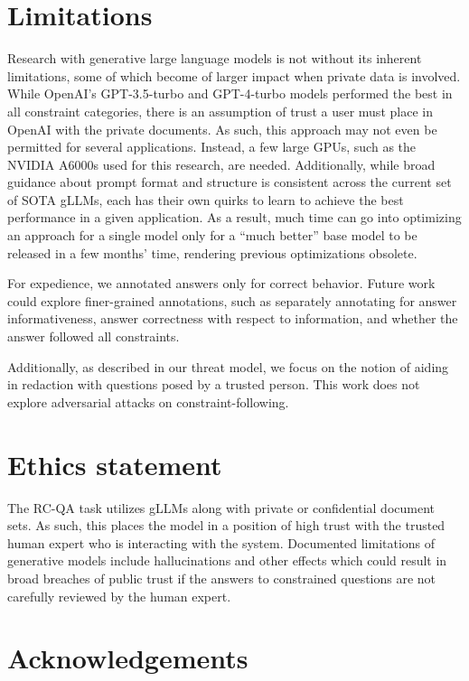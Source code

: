 \documentclass[11pt]{article}
\newcommand{\gptthree}{GPT-3.5-turbo\xspace}
\newcommand{\gptfour}{GPT-4-turbo\xspace}
\begin{document}
\section*{Limitations}

Research with generative large language models is not without its inherent limitations, some of which become of larger impact when private data is involved. While OpenAI's \gptthree and \gptfour models performed the best in all constraint categories, there is an assumption of trust a user must place in OpenAI with the private documents. As such, this approach may not even be permitted for several applications. Instead, a few large GPUs, such as the NVIDIA A6000s used for this research, are needed. Additionally, while broad guidance about prompt format and structure is consistent across the current set of SOTA gLLMs, each has their own quirks to learn to achieve the best performance in a given application. As a result, much time can go into optimizing an approach for a single model only for a ``much better'' base model to be released in a few months' time, rendering previous optimizations obsolete.

For expedience, we annotated answers only for correct behavior. Future work could explore finer-grained annotations, such as separately annotating for answer informativeness, answer correctness with respect to information, and whether the answer followed all constraints.

Additionally, as described in our threat model, we focus on the notion of aiding in redaction with questions posed by a trusted person. This work does not explore adversarial attacks on constraint-following.

\section*{Ethics statement}

The RC-QA task utilizes gLLMs along with private or confidential document sets. As such, this places the model in a position of high trust with the trusted human expert who is interacting with the system. Documented limitations of generative models include hallucinations and other effects which could result in broad breaches of public trust if the answers to constrained questions are not carefully reviewed by the human expert.

\section*{Acknowledgements}
\end{document}
